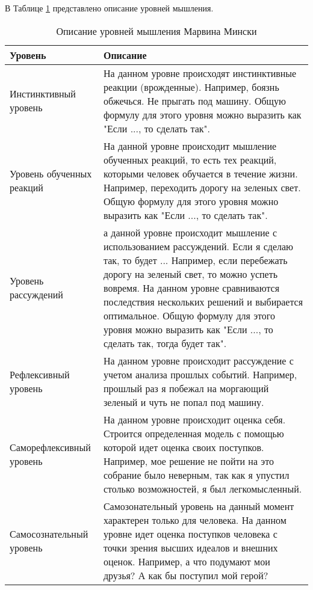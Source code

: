 В Таблице \ref{ThinkingLevelDescription} представлено описание уровней мышления.
\begin{table} [htbp]
  \centering
  \parbox{15cm}{\caption{Описание уровней мышления Марвина Мински}\label{ThinkingLevelDescription}}
  \begin{tabular}{| p{5cm} | p{11cm} |}
  \hline
  \hline
Уровень & Описание \\
  \hline
    \hline

Инстинктивный уровень	& На данном уровне происходят инстинктивные реакции (врожденные). Например, боязнь обжечься. Не прыгать под машину. Общую формулу для этого уровня можно выразить как "Если ..., то сделать так". \\
  \hline

Уровень обученных реакций  & На  данной уровне происходит мышление обученных реакций, то есть тех реакций, которыми человек обучается в течение жизни. Например, переходить дорогу на зеленых свет. Общую формулу для этого уровня можно выразить как "Если ..., то сделать так". \\
  \hline

Уровень рассуждений & а  данной уровне происходит мышление с использованием рассуждений. Если я сделаю так, то будет ... Например, если перебежать дорогу на зеленый свет, то можно успеть вовремя. На данном уровне сравниваются последствия нескольких решений и выбирается оптимальное. Общую формулу для этого уровня можно выразить как "Если ..., то сделать так, тогда будет так". \\
  \hline

Рефлексивный уровень  & На данном уровне происходит рассуждение с учетом анализа прошлых событий. Например, прошлый раз я побежал на моргающий зеленый и чуть не попал под машину. \\

  \hline
  Саморефлексивный уровень & На данном уровне происходит оценка себя. Строится определенная модель с помощью которой идет оценка своих поступков. Например, мое решение не пойти на это собрание было неверным, так как я упустил столько возможностей, я был легкомысленный. \\
  \hline
  Самосознательный уровень & Самозонательный уровень на данный момент характерен только для человека. На данном уровне идет оценка поступков человека с точки зрения высших идеалов и внешних оценок. Например, а что подумают мои друзья? А как бы поступил мой герой? \\
  \hline
  
  \end{tabular}
\end{table}


